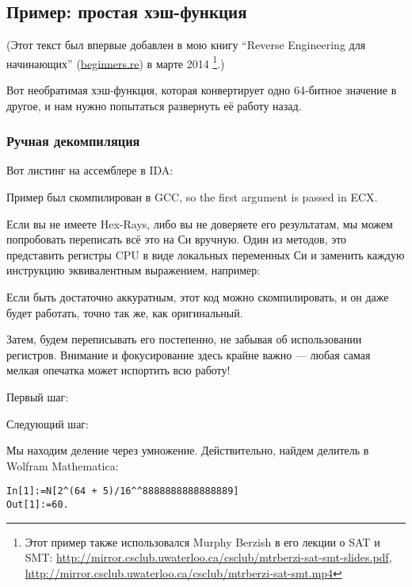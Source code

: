 \subsection{Пример: простая хэш-функция}

(Этот текст был впервые добавлен в мою книгу ``Reverse Engineering для начинающих'' (\url{beginners.re}) в марте 2014
\footnote{Этот пример также использовался Murphy Berzish в его лекции о \ac{SAT} и \ac{SMT}:
\url{http://mirror.csclub.uwaterloo.ca/csclub/mtrberzi-sat-smt-slides.pdf},
\url{http://mirror.csclub.uwaterloo.ca/csclub/mtrberzi-sat-smt.mp4}}.)

Вот необратимая хэш-функция, которая конвертирует одно 64-битное значение в другое,
и нам нужно попытаться развернуть её работу назад.

\subsubsection{Ручная декомпиляция}

Вот листинг на ассемблере в IDA:



Пример был скомпилирован в GCC, so the first argument is passed in ECX.

Если вы не имеете Hex-Rays, либо вы не доверяете его результатам, мы можем попробовать
переписать всё это на Си вручную.
Один из методов, это представить регистры \ac{CPU} в виде локальных переменных Си и заменить каждую инструкцию
эквивалентным выражением, например:



Если быть достаточно аккуратным, этот код можно скомпилировать, и он даже будет работать, 
точно так же, как оригинальный.

Затем, будем переписывать его постепенно, не забывая об использовании регистров.
Внимание и фокусирование здесь крайне важно --- любая самая мелкая опечатка может испортить всю работу!

Первый шаг:



Следующий шаг:




Мы находим деление через умножение.
Действительно, найдем делитель в Wolfram Mathematica:

\begin{lstlisting}[caption=Wolfram Mathematica]
In[1]:=N[2^(64 + 5)/16^^8888888888888889]
Out[1]:=60.
\end{lstlisting}

